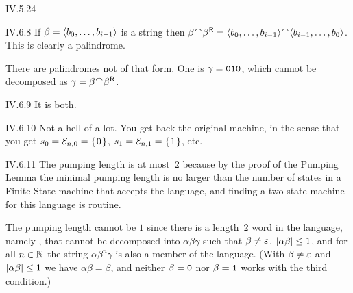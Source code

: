 %
\begin{ans}{IV.5.24}
\end{ans}
%
\begin{ans}{IV.6.8}
  If $\beta=\langle b_0,\ldots,b_{i-1}\rangle$ is a string then
  $\beta\concat\reversal{\beta}
  =\sequence{b_0,\ldots,b_{i-1}}\concat\sequence{b_{i-1},\ldots,b_0}$.
  This is clearly a palindrome.

  There are palindromes not of that form.
  One is $\gamma=\texttt{010}$, which
  cannot be decomposed as $\gamma=\beta\concat\reversal{\beta}$.
  
\end{ans}
%
\begin{ans}{IV.6.9}
  It is both.
  
\end{ans}
%
\begin{ans}{IV.6.10}
      Not a hell of a lot.
      You get back the original machine, in the sense that
      you get $s_0=\mathcal{E}_{n,0}=\set{0}$,
      $s_1=\mathcal{E}_{n,1}=\set{1}$, etc.
    
\end{ans}
%
\begin{ans}{IV.6.11}
  The pumping length is at most~$2$ because by the proof of the Pumping Lemma
  the minimal pumping length is no larger than the number of states in
  a Finite State machine that accepts the language, and finding a
  two-state machine for this language is routine.

  The pumping length cannot be $1$
  since there is a length~$2$
  word in the language, namely , that cannot be decomposed into
  $\alpha\beta\gamma$ such
  that $\beta\neq\varepsilon$, $|\alpha\beta|\leq 1$,
  and for all $n\in\mathbb{N}$ the string
  $\alpha\beta^n\gamma$ is also a member of the language.
  (With $\beta\neq\varepsilon$ and $|\alpha\beta|\leq 1$
  we have $\alpha\beta=\beta$, and neither $\beta=\texttt{0}$ nor
  $\beta=\texttt{1}$ works with the third condition.)
  
\end{ans}
